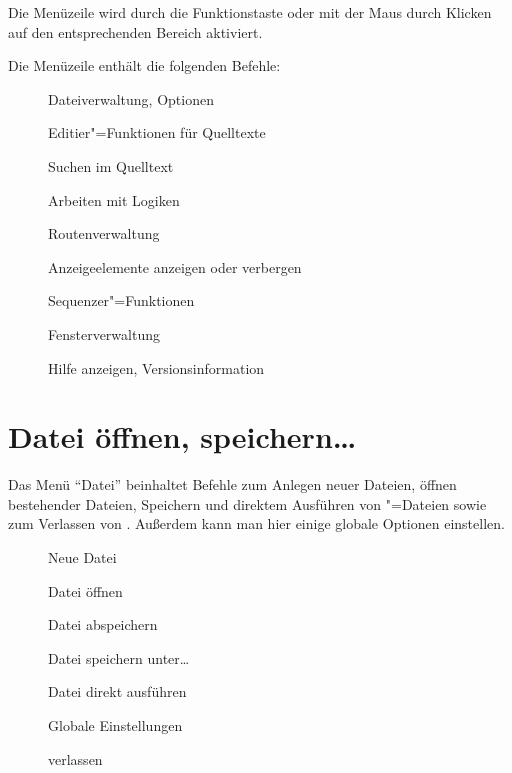 Die Menüzeile wird durch die Funktionstaste  oder mit der 
Maus durch Klicken auf den entsprechenden Bereich aktiviert.

Die Menüzeile enthält die folgenden Befehle:
\relax{}\relax
\begin{description}
\item[] Dateiverwaltung, Optionen
\item[] Editier"=Funktionen für Quelltexte
\item[] Suchen im Quelltext
\item[] Arbeiten mit Logiken
\item[] Routenverwaltung
\item[] Anzeigeelemente anzeigen oder verbergen
\item[] Sequenzer"=Funktionen
\item[] Fensterverwaltung
\item[] Hilfe anzeigen, Versionsinformation
\end{description}
\relax{}\relax


\section{Datei öffnen, speichern\dots{}}
\label{sec:MS_FILE}

Das Menü "`Datei"' beinhaltet Befehle zum Anlegen neuer Dateien, 
öffnen bestehender Dateien, Speichern und direktem Ausführen 
von \mutabor{}"=Dateien sowie zum Verlassen von \mutabor{}. 
Außerdem kann man hier einige globale Optionen einstellen.


\relax{}\relax
\begin{description}
\item[] Neue Datei
\item[] Datei öffnen
\item[] Datei abspeichern
\item[] Datei speichern unter\dots
\item[] Datei direkt ausführen
\item[] Globale Einstellungen
\item[] \mutabor{} verlassen
\end{description}
\relax{}\relax


